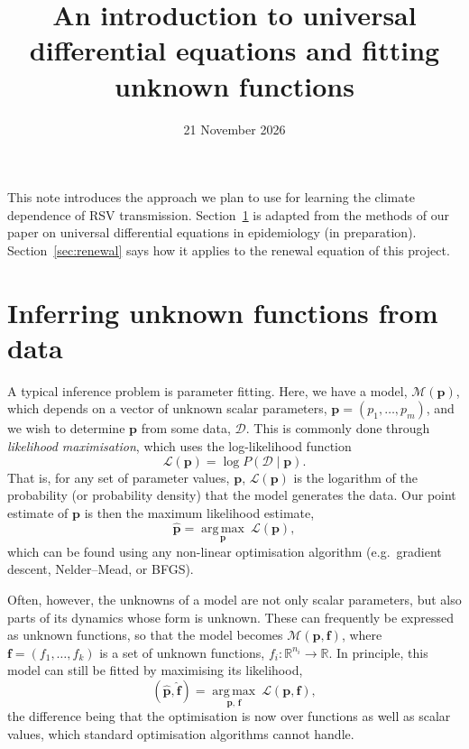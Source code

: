 \documentclass[11pt,a4paper]{article}
\title{An introduction to universal differential equations and fitting unknown functions}
\author{}
\date{21 November 2026}
\renewcommand{\vec}[1]{\boldsymbol{#1}}
\begin{document}
\maketitle

\vspace{-36pt}

This note introduces the approach we plan to use for learning the climate dependence of RSV transmission. Section~\ref{sec:function_inference} is adapted from the methods of our paper on universal differential equations in epidemiology (in preparation). Section~\ref{sec:renewal} says how it applies to the renewal equation of this project.

\section{Inferring unknown functions from data}\label{sec:function_inference}

A typical inference problem is parameter fitting. Here, we have a model, $\mathcal{M}(\vec{p})$, which depends on a vector of unknown scalar parameters, $\vec{p} = (p_1, \ldots, p_m)$, and we wish to determine $\vec{p}$ from some data, $\mathcal{D}$. This is commonly done through \emph{likelihood maximisation}, which uses the log-likelihood function
\begin{equation*}
    \mathcal{L}(\vec{p}) = \log P(\mathcal{D} \mid \vec{p}).
\end{equation*}
That is, for any set of parameter values, $\vec{p}$, $\mathcal{L}(\vec{p})$ is the logarithm of the probability (or probability density) that the model generates the data. Our point estimate of $\vec{p}$ is then the maximum likelihood estimate,
\begin{equation*}
    \hat{\vec{p}} = \operatorname*{arg\,max}_{\vec{p}}\ \mathcal{L}(\vec{p}),
\end{equation*}
which can be found using any non-linear optimisation algorithm (e.g.\ gradient descent, Nelder--Mead, or BFGS).

Often, however, the unknowns of a model are not only scalar parameters, but also parts of its dynamics whose form is unknown. These can frequently be expressed as unknown functions, so that the model becomes $\mathcal{M}(\vec{p}, \vec{f})$, where $\vec{f} = (f_1, \ldots, f_k)$ is a set of unknown functions, $f_i:\mathbb{R}^{n_i} \to \mathbb{R}$. In principle, this model can still be fitted by maximising its likelihood,
\begin{equation*}
    (\hat{\vec{p}}, \hat{\vec{f}}) = \operatorname*{arg\,max}_{\vec{p},\, \vec{f}}\ \mathcal{L}(\vec{p}, \vec{f}),
\end{equation*}
the difference being that the optimisation is now over functions as well as scalar values, which standard optimisation algorithms cannot handle.
\end{document}
